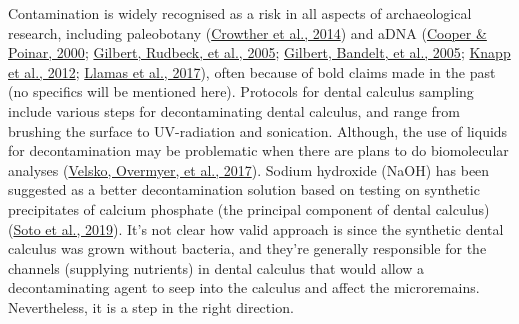 \documentclass[
  letterpaper,
]{book}
\begin{document}
Contamination is widely recognised as a risk in all aspects of
archaeological research, including paleobotany
(\protect\hyperlink{ref-crowtherDocumentingContamination2014}{Crowther
et al., 2014}) and aDNA
(\protect\hyperlink{ref-cooperAncientDNA2000}{Cooper \& Poinar, 2000};
\protect\hyperlink{ref-gilbertBiochemicalPhysical2005}{Gilbert, Rudbeck,
et al., 2005};
\protect\hyperlink{ref-gilbertAssessingAncient2005}{Gilbert, Bandelt, et
al., 2005}; \protect\hyperlink{ref-knappSettingStage2012}{Knapp et al.,
2012}; \protect\hyperlink{ref-llamasFieldLaboratory2017}{Llamas et al.,
2017}), often because of bold claims made in the past (no specifics will
be mentioned here). Protocols for dental calculus sampling include
various steps for decontaminating dental calculus, and range from
brushing the surface to UV-radiation and sonication. Although, the use
of liquids for decontamination may be problematic when there are plans
to do biomolecular analyses
(\protect\hyperlink{ref-velskoDentalCalculus2017}{Velsko, Overmyer, et
al., 2017}). Sodium hydroxide (NaOH) has been suggested as a better
decontamination solution based on testing on synthetic precipitates of
calcium phosphate (the principal component of dental calculus)
(\protect\hyperlink{ref-sotoCharacterizationDecontamination2019}{Soto et
al., 2019}). It's not clear how valid approach is since the synthetic
dental calculus was grown without bacteria, and they're generally
responsible for the channels (supplying nutrients) in dental calculus
that would allow a decontaminating agent to seep into the calculus and
affect the microremains. Nevertheless, it is a step in the right
direction.
\end{document}
